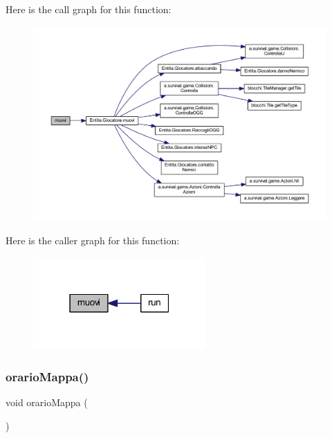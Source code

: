Here is the call graph for this function\+:
\nopagebreak
\begin{figure}[H]
\begin{center}
\leavevmode
\includegraphics[width=350pt]{classa_1_1survival_1_1game_1_1_pannello_a1fe2f184b3cc7345c6a0f08d183a1d0b_cgraph}
\end{center}
\end{figure}
Here is the caller graph for this function\+:
\nopagebreak
\begin{figure}[H]
\begin{center}
\leavevmode
\includegraphics[width=187pt]{classa_1_1survival_1_1game_1_1_pannello_a1fe2f184b3cc7345c6a0f08d183a1d0b_icgraph}
\end{center}
\end{figure}
\mbox{\label{classa_1_1survival_1_1game_1_1_pannello_abe2c4192cc87f74e6d45d5b5fe5283c3}} 
\subsubsection{\texorpdfstring{orario\+Mappa()}{orarioMappa()}}
{\footnotesize\ttfamily void orario\+Mappa (\begin{DoxyParamCaption}{ }\end{DoxyParamCaption})}

